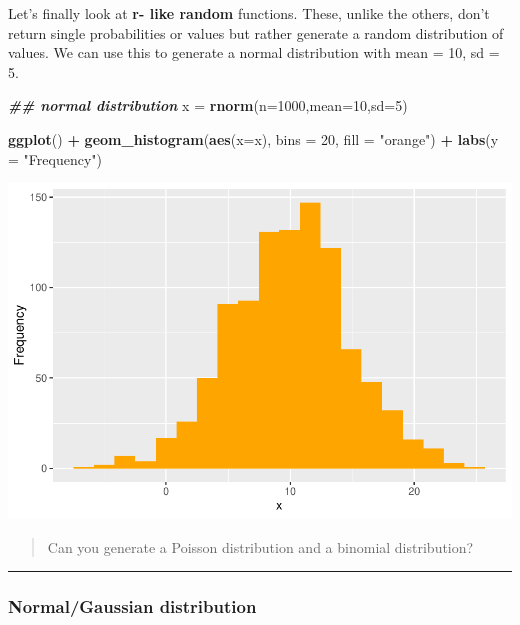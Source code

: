 \documentclass[
]{book}
\newenvironment{Shaded}{\begin{snugshade}}{\end{snugshade}}
\newcommand{\AttributeTok}[1]{\textcolor[rgb]{0.13,0.29,0.53}{#1}}
\newcommand{\DecValTok}[1]{\textcolor[rgb]{0.00,0.00,0.81}{#1}}
\newcommand{\DocumentationTok}[1]{\textcolor[rgb]{0.56,0.35,0.01}{\textbf{\textit{#1}}}}
\newcommand{\FunctionTok}[1]{\textcolor[rgb]{0.13,0.29,0.53}{\textbf{#1}}}
\newcommand{\NormalTok}[1]{#1}
\newcommand{\OtherTok}[1]{\textcolor[rgb]{0.56,0.35,0.01}{#1}}
\newcommand{\SpecialCharTok}[1]{\textcolor[rgb]{0.81,0.36,0.00}{\textbf{#1}}}
\newcommand{\StringTok}[1]{\textcolor[rgb]{0.31,0.60,0.02}{#1}}
\begin{document}
Let's finally look at \textbf{r- like random} functions. These, unlike the others, don't return single probabilities or values but rather generate a random distribution of values. We can use this to generate a normal distribution with mean = 10, sd = 5.

\begin{Shaded}
\begin{Highlighting}[]
\DocumentationTok{\#\# normal distribution}
\NormalTok{x }\OtherTok{=} \FunctionTok{rnorm}\NormalTok{(}\AttributeTok{n=}\DecValTok{1000}\NormalTok{,}\AttributeTok{mean=}\DecValTok{10}\NormalTok{,}\AttributeTok{sd=}\DecValTok{5}\NormalTok{)}

\FunctionTok{ggplot}\NormalTok{() }\SpecialCharTok{+}
  \FunctionTok{geom\_histogram}\NormalTok{(}\FunctionTok{aes}\NormalTok{(}\AttributeTok{x=}\NormalTok{x), }\AttributeTok{bins =} \DecValTok{20}\NormalTok{,}
                 \AttributeTok{fill =} \StringTok{"orange"}\NormalTok{) }\SpecialCharTok{+}
  \FunctionTok{labs}\NormalTok{(}\AttributeTok{y =} \StringTok{"Frequency"}\NormalTok{) }
\end{Highlighting}
\end{Shaded}

\includegraphics{_main_files/figure-latex/unnamed-chunk-93-1.pdf}

\begin{quote}
Can you generate a Poisson distribution and a binomial distribution?
\end{quote}

\begin{center}\rule{0.5\linewidth}{0.5pt}\end{center}

\hypertarget{normalgaussian-distribution}{%
\subsubsection{Normal/Gaussian distribution}\label{normalgaussian-distribution}}
\end{document}
